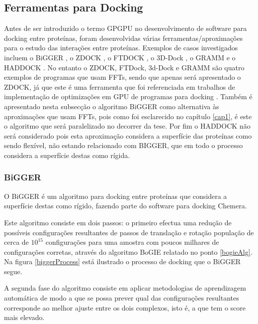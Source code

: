 \subsection{Ferramentas para Docking}
Antes de ser introduzido o termo GPGPU no desenvolvimento de software para docking entre proteínas, foram desenvolvidas várias ferramentas/aproximações para o estudo das interações entre proteínas. Exemplos de casos investigados incluem o BiGGER \cite{biggerPaper}, o ZDOCK \cite{zdock}, o FTDOCK \cite{ftdock}, o 3D-Dock \cite{halperin}, o GRAMM\cite{prediction} e o HADDOCK\cite{dominguez2003haddock} . No entanto o ZDOCK, FTDock, 3d-Dock e GRAMM são quatro exemplos de programas que usam FFTs, sendo que apenas será apresentado o ZDOCK, já que este é uma ferramenta que foi referenciada em trabalhos de implementação de optimizações em GPU de programas para docking \cite{megadock40} \cite{shimoda2015protein}. Também é apresentado nesta subsecção o algoritmo BiGGER \cite{biggerPaper} como alternativa às aproximações que usam FFTs, pois como foi esclarecido no capítulo \ref{cap1}, é este o algoritmo que será paralelizado no decorrer da tese. Por fim o HADDOCK não será considerado pois esta aproximação considera a superfície das proteínas como sendo flexível, não estando relacionado com BIGGER, que em todo o processo considera a superfície destas como rígida.

\subsubsection{BiGGER}
\label{biggerAlg}
O BiGGER\cite{biggerPaper} é um algoritmo para docking entre proteínas que considera a superfície destas como rígido, fazendo parte do software para docking Chemera.

Este algoritmo consiste em dois passos: o primeiro efectua uma redução de possíveis configurações resultantes de passos de translação e rotação população de cerca de $10^{15}$ configurações para uma amostra com poucos milhares de configurações corretas, através do algoritmo BoGIE relatado no ponto \ref{bogieAlg}. Na figura \ref{biggerProcess} está ilustrado o processo de docking que o BiGGER segue.

A segunda fase do algoritmo consiste em aplicar metodologias de aprendizagem automática de modo a que se possa prever qual das configurações resultantes corresponde ao melhor ajuste entre os dois complexos, isto é, a que tem o score mais elevado.
 

